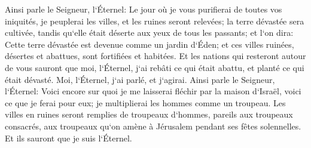 \verse Ainsi parle le Seigneur, l`Éternel: Le jour où je vous purifierai de toutes vos iniquités, je peuplerai les villes, et les ruines seront relevées; 
\verse la terre dévastée sera cultivée, tandis qu`elle était déserte aux yeux de tous les passants; 
\verse et l`on dira: Cette terre dévastée est devenue comme un jardin d`Éden; et ces villes ruinées, désertes et abattues, sont fortifiées et habitées. 
\verse Et les nations qui resteront autour de vous sauront que moi, l`Éternel, j`ai rebâti ce qui était abattu, et planté ce qui était dévasté. Moi, l`Éternel, j`ai parlé, et j`agirai. 
\verse Ainsi parle le Seigneur, l`Éternel: Voici encore sur quoi je me laisserai fléchir par la maison d`Israël, voici ce que je ferai pour eux; je multiplierai les hommes comme un troupeau. 
\verse Les villes en ruines seront remplies de troupeaux d`hommes, pareils aux troupeaux consacrés, aux troupeaux qu`on amène à Jérusalem pendant ses fêtes solennelles. Et ils sauront que je suis l`Éternel. 

\chapter{}

